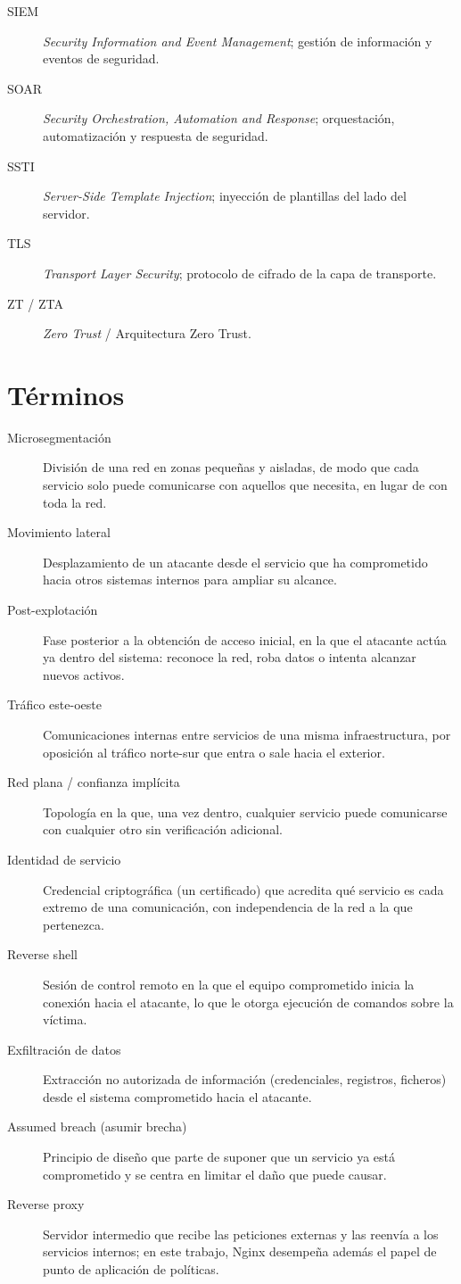 \documentclass[11pt,spanish,listoffigures,listoftables]{tfgetsinf}
\begin{document}
\begin{description}
    \item[SIEM] \textit{Security Information and Event Management}; gestión de información y eventos de seguridad.
    \item[SOAR] \textit{Security Orchestration, Automation and Response}; orquestación, automatización y respuesta de seguridad.
    \item[SSTI] \textit{Server-Side Template Injection}; inyección de plantillas del lado del servidor.
    \item[TLS] \textit{Transport Layer Security}; protocolo de cifrado de la capa de transporte.
    \item[ZT / ZTA] \textit{Zero Trust} / Arquitectura Zero Trust.
\end{description}

\section{Términos}

\begin{description}
    \item[Microsegmentación] División de una red en zonas pequeñas y aisladas, de modo que cada servicio solo puede comunicarse con aquellos que necesita, en lugar de con toda la red.
    \item[Movimiento lateral] Desplazamiento de un atacante desde el servicio que ha comprometido hacia otros sistemas internos para ampliar su alcance.
    \item[Post-explotación] Fase posterior a la obtención de acceso inicial, en la que el atacante actúa ya dentro del sistema: reconoce la red, roba datos o intenta alcanzar nuevos activos.
    \item[Tráfico este-oeste] Comunicaciones internas entre servicios de una misma infraestructura, por oposición al tráfico norte-sur que entra o sale hacia el exterior.
    \item[Red plana / confianza implícita] Topología en la que, una vez dentro, cualquier servicio puede comunicarse con cualquier otro sin verificación adicional.
    \item[Identidad de servicio] Credencial criptográfica (un certificado) que acredita qué servicio es cada extremo de una comunicación, con independencia de la red a la que pertenezca.
    \item[Reverse shell] Sesión de control remoto en la que el equipo comprometido inicia la conexión hacia el atacante, lo que le otorga ejecución de comandos sobre la víctima.
    \item[Exfiltración de datos] Extracción no autorizada de información (credenciales, registros, ficheros) desde el sistema comprometido hacia el atacante.
    \item[Assumed breach (asumir brecha)] Principio de diseño que parte de suponer que un servicio ya está comprometido y se centra en limitar el daño que puede causar.
    \item[Reverse proxy] Servidor intermedio que recibe las peticiones externas y las reenvía a los servicios internos; en este trabajo, Nginx desempeña además el papel de punto de aplicación de políticas.
\end{description}


\end{document}
